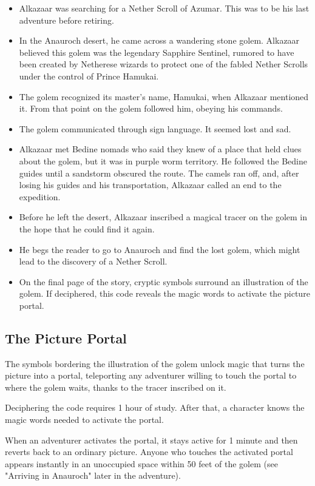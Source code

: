 \documentclass[10pt,a4paper,twoside,bg=print,twocolumn,openany,nodeprecatedcode]{dndbook}
\begin{document}
\begin{itemize}
\item Alkazaar was searching for a Nether Scroll of Azumar. This was to be his last adventure before retiring.
\item In the Anauroch desert, he came across a wandering stone golem. Alkazaar believed this golem was the legendary Sapphire Sentinel, rumored to have been created by Netherese wizards to protect one of the fabled Nether Scrolls under the control of Prince Hamukai.
\item The golem recognized its master's name, Hamukai, when Alkazaar mentioned it. From that point on the golem followed him, obeying his commands.
\item The golem communicated through sign language. It seemed lost and sad.
\item Alkazaar met Bedine nomads who said they knew of a place that held clues about the golem, but it was in purple worm territory. He followed the Bedine guides until a sandstorm obscured the route. The camels ran off, and, after losing his guides and his transportation, Alkazaar called an end to the expedition.
\item Before he left the desert, Alkazaar inscribed a magical tracer on the golem in the hope that he could find it again.
\item He begs the reader to go to Anauroch and find the lost golem, which might lead to the discovery of a Nether Scroll.
\item On the final page of the story, cryptic symbols surround an illustration of the golem. If deciphered, this code reveals the magic words to activate the picture portal.
\end{itemize}

\subsection{The Picture Portal}
The symbols bordering the illustration of the golem unlock magic that turns the picture into a portal, teleporting any adventurer willing to touch the portal to where the golem waits, thanks to the tracer inscribed on it.

Deciphering the code requires 1 hour of study. After that, a character knows the magic words needed to activate the portal.

When an adventurer activates the portal, it stays active for 1 minute and then reverts back to an ordinary picture. Anyone who touches the activated portal appears instantly in an unoccupied space within 50 feet of the golem (see "Arriving in Anauroch" later in the adventure).
\end{document}
